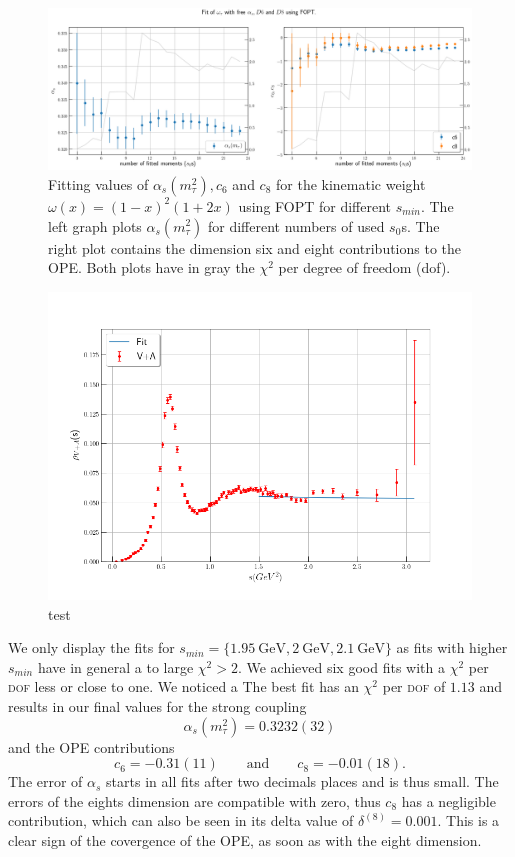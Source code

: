 \documentclass[../../index.tex]{subfiles}
\begin{document}
\begin{figure}
  \centering
  \includegraphics[width=\textwidth]{./images/fitWKinAlD6D8.png}
  \caption{Fitting values of $\alpha_s(m_\tau^2), c_6$ and $c_8$ for the kinematic weight
    $\omega(x)=(1-x)^2(1+2x)$ using FOPT for different $s_{min}$. The left graph plots $\alpha_s(m_\tau^2)$ for
    different numbers of used $s_0$s. The right plot contains the dimension six
    and eight contributions to the OPE. Both plots have in gray the $\chi^2$ per
  degree of freedom (dof).}
  \label{fig:fitWKinAlD6D8}
\end{figure}
\begin{figure}
  \centering
  \includegraphics[width=\textwidth]{./images/fitWKinAlD6D8SpecFunc.png}
  \caption{test}
\end{figure}
We only display the fits for $s_{min}=\{\SI{1.95}{\giga\eV}, \SI{2}{\giga\eV},
\SI{2.1}{\giga\eV}\}$ as fits with higher $s_{min}$ have in general a to large
$\chi^2>2$. We achieved six good fits with a $\chi^2$ per \textsc{dof} less or
close to one. We noticed a  The best fit
has an $\chi^2$ per \textsc{dof} of $1.13$ and results in our final values for
the strong coupling
\begin{equation}
  \alpha_s(m_\tau^2) = 0.3232(32)
\end{equation}
and the OPE contributions
\begin{equation}
  c_6 = -0.31(11) \qquad \text{and} \qquad c_8 = -0.01(18).
\end{equation}
The error of $\alpha_s$ starts in all fits after two decimals places and is thus small. The
errors of the eights dimension are compatible with zero, thus $c_8$ has a
negligible contribution, which can also be seen in its delta value of
$\delta^{(8)}=0.001$. This is a clear sign of the covergence of the OPE, as soon as with
the eight dimension.
\end{document}

